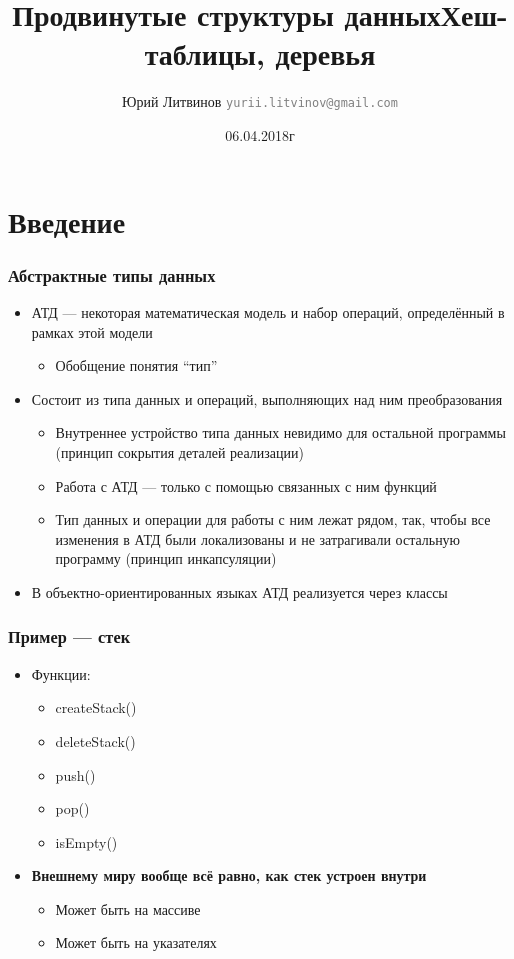 \documentclass[xetex,mathserif,serif]{beamer}
\title{Продвинутые структуры данных}
\title{Хеш-таблицы, деревья}
\author[Юрий Литвинов]{Юрий Литвинов \newline \textcolor{gray}{\small\texttt{yurii.litvinov@gmail.com}}}
\date{06.04.2018г}
\begin{document}
	
	\frame{\titlepage}

	\section{Введение}

	\begin{frame}
		\frametitle{Абстрактные типы данных}
		\begin{itemize}
			\item АТД --- некоторая математическая модель и набор операций, определённый в рамках этой модели
			\begin{itemize}
				\item Обобщение понятия ``тип''
			\end{itemize}
			\item Состоит из типа данных и операций, выполняющих над ним преобразования
			\begin{itemize}
				\item Внутреннее устройство типа данных невидимо для остальной программы (принцип сокрытия деталей реализации)
				\item Работа с АТД --- только с помощью связанных с ним функций
				\item Тип данных и операции для работы с ним лежат рядом, так, чтобы все изменения в АТД были локализованы и не затрагивали остальную программу (принцип инкапсуляции)
			\end{itemize}
			\item В объектно-ориентированных языках АТД реализуется через классы
		\end{itemize}
	\end{frame}

	\begin{frame}
		\frametitle{Пример --- стек}
		\begin{itemize}
			\item Функции:
			\begin{itemize}
				\item createStack()
				\item deleteStack()
				\item push()
				\item pop()
				\item isEmpty()
			\end{itemize}
			\item \textbf{Внешнему миру вообще всё равно, как стек устроен внутри}
			\begin{itemize}
				\item Может быть на массиве
				\item Может быть на указателях
			\end{itemize}
		\end{itemize}
	\end{frame}
\end{document}
